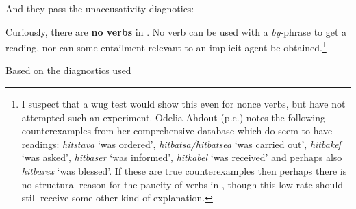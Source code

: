 \begin{exe}
\begin{xlist}
\begin{xlist}
\begin{exe}
\begin{xlist}
\begin{xlist}
\begin{exe}
\begin{xlist}
\begin{xlist}
\begin{exe}
\begin{exe}
\begin{xlist}
\begin{exe}
\begin{exe}
\begin{xlist}
\begin{exe}
\begin{exe}
\begin{exe}
\begin{exe}
\begin{exe}
\begin{xlist}
\begin{exe}
\begin{xlist}
\begin{exe}
\begin{exe}
\begin{xlist}
\begin{exe}
\begin{xlist}
\begin{exe}
\begin{exe}
\begin{exe}
\begin{xlist}
\begin{exe}
\begin{exe}
\begin{exe}
\begin{xlist}
\begin{exe}
\begin{xlist}
\begin{exe}
\begin{xlist}
\begin{exe}
\begin{xlist}
\begin{exe}
\begin{exe}
\begin{exe}
\begin{exe}
\begin{xlist}
\begin{exe}
\begin{xlist}
\begin{exe}
\begin{xlist}
\begin{exe}
\begin{xlist}
\begin{exe}
\begin{xlist}
\begin{exe}
\begin{xlist}
\begin{exe}
\begin{exe}
\begin{exe}
\begin{exe}
\begin{xlist}
\begin{exe}
\begin{xlist}
\begin{exe}
\begin{xlist}
\begin{exe}
\begin{exe}
\begin{xlist}
\begin{exe}
\begin{exe}
\begin{exe}
\begin{exe}
\begin{xlist}
\begin{xlist}
\begin{exe}
\begin{xlist}
 \z
\z 

And they pass the unaccusativity diagnotics:
 \begin{exe}
	
	
 \z 

Curiously, there are \textbf{no  verbs} in {\thit}. No verb can be used with a \emph{by}-phrase to get a  reading, nor can some entailment relevant to an implicit agent be obtained.\footnote{I suspect that a wug test would show this even for nonce verbs, but have not attempted such an experiment. Odelia Ahdout (p.c.) notes the following counterexamples from her comprehensive database which do seem to have  readings: \emph{hitstava} `was ordered', \emph{hitbatsa/hitbatsea} `was carried out', \emph{hitbakeʃ} `was asked', \emph{hitbaser} `was informed', \emph{hitkabel} `was received' and perhaps also \emph{hitbarex} `was blessed'. If these are true counterexamples then perhaps there is no structural reason for the paucity of  verbs in {\thit}, though this low rate should still receive some other kind of explanation.}
 \begin{exe}
	
 \z 

Based on the diagnostics used 
\end{exe}
\end{exe}
\end{xlist}
\end{exe}
\end{xlist}
\end{xlist}
\end{exe}
\end{exe}
\end{exe}
\end{exe}
\end{xlist}
\end{exe}
\end{exe}
\end{xlist}
\end{exe}
\end{xlist}
\end{exe}
\end{xlist}
\end{exe}
\end{exe}
\end{exe}
\end{exe}
\end{xlist}
\end{exe}
\end{xlist}
\end{exe}
\end{xlist}
\end{exe}
\end{xlist}
\end{exe}
\end{xlist}
\end{exe}
\end{xlist}
\end{exe}
\end{exe}
\end{exe}
\end{exe}
\end{xlist}
\end{exe}
\end{xlist}
\end{exe}
\end{xlist}
\end{exe}
\end{xlist}
\end{exe}
\end{exe}
\end{exe}
\end{xlist}
\end{exe}
\end{exe}
\end{exe}
\end{xlist}
\end{exe}
\end{xlist}
\end{exe}
\end{exe}
\end{xlist}
\end{exe}
\end{xlist}
\end{exe}
\end{exe}
\end{exe}
\end{exe}
\end{exe}
\end{xlist}
\end{exe}
\end{exe}
\end{xlist}
\end{exe}
\end{exe}
\end{xlist}
\end{xlist}
\end{exe}
\end{xlist}
\end{xlist}
\end{exe}
\end{xlist}
\end{xlist}
\end{exe}
